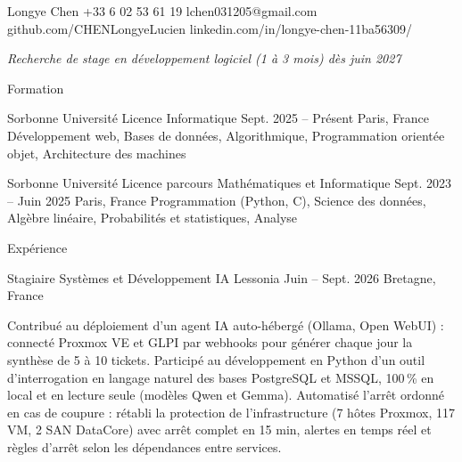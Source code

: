 \documentclass[11pt]{cv_template}
\begin{document}
\begin{cv}

\cvheader
{Longye Chen}
{+33 6 02 53 61 19}
{lchen031205@gmail.com}
{github.com/CHENLongyeLucien}
{}
{linkedin.com/in/longye-chen-11ba56309/}

\begin{center}
\textit{Recherche de stage en développement logiciel (1 à 3 mois) dès juin 2027}
\end{center}

\begin{cvsection}{Formation}

\begin{cvsubsection}
{Sorbonne Université} {Licence Informatique} {Sept. 2025 -- Présent} {Paris, France}
\listitem Développement web, Bases de données, Algorithmique, Programmation orientée objet, Architecture des machines
\end{cvsubsection}

\begin{cvsubsection}
{Sorbonne Université} {Licence parcours Mathématiques et Informatique} {Sept. 2023 -- Juin 2025} {Paris, France}
\listitem Programmation (Python, C), Science des données, Algèbre linéaire, Probabilités et statistiques, Analyse
\end{cvsubsection}

\end{cvsection}

\begin{cvsection}{Expérience}

\begin{cvsubsection}
{Stagiaire Systèmes et Développement IA} {Lessonia} {Juin -- Sept. 2026} {Bretagne, France}

\listitem Contribué au déploiement d'un agent IA auto-hébergé (Ollama, Open WebUI) : connecté Proxmox VE et GLPI par webhooks pour générer chaque jour la synthèse de 5 à 10 tickets.
\listitem Participé au développement en Python d'un outil d'interrogation en langage naturel des bases PostgreSQL et MSSQL, 100\,\% en local et en lecture seule (modèles Qwen et Gemma).
\listitem Automatisé l'arrêt ordonné en cas de coupure : rétabli la protection de l'infrastructure (7 hôtes Proxmox, 117 VM, 2 SAN DataCore) avec arrêt complet en 15 min, alertes en temps réel et règles d'arrêt selon les dépendances entre services.

\end{cvsubsection}

\end{cvsection}


\end{cv}
\end{document}
